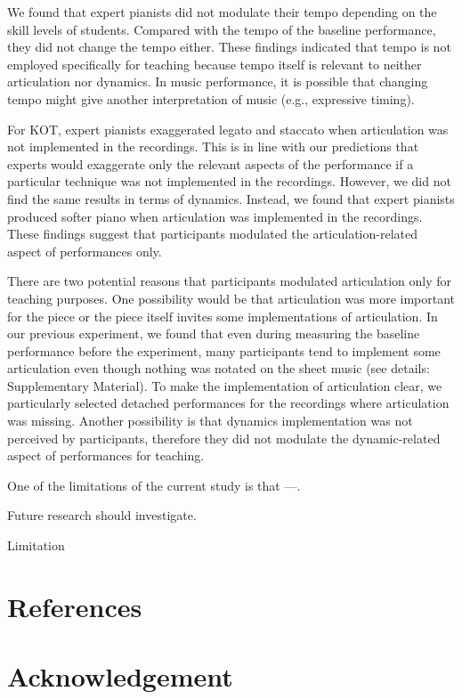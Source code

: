 \documentclass[
  man]{apa6}
\begin{document}
We found that expert pianists did not modulate their tempo depending on the skill levels of students. Compared with the tempo of the baseline performance, they did not change the tempo either. These findings indicated that tempo is not employed specifically for teaching because tempo itself is relevant to neither articulation nor dynamics. In music performance, it is possible that changing tempo might give another interpretation of music (e.g., expressive timing).

For KOT, expert pianists exaggerated legato and staccato when articulation was not implemented in the recordings. This is in line with our predictions that experts would exaggerate only the relevant aspects of the performance if a particular technique was not implemented in the recordings. However, we did not find the same results in terms of dynamics. Instead, we found that expert pianists produced softer piano when articulation was implemented in the recordings. These findings suggest that participants modulated the articulation-related aspect of performances only.

There are two potential reasons that participants modulated articulation only for teaching purposes. One possibility would be that articulation was more important for the piece or the piece itself invites some implementations of articulation. In our previous experiment, we found that even during measuring the baseline performance before the experiment, many participants tend to implement some articulation even though nothing was notated on the sheet music (see details: Supplementary Material). To make the implementation of articulation clear, we particularly selected detached performances for the recordings where articulation was missing. Another possibility is that dynamics implementation was not perceived by participants, therefore they did not modulate the dynamic-related aspect of performances for teaching.

One of the limitations of the current study is that ---.

Future research should investigate.

Limitation

\hypertarget{references}{%
\section{References}\label{references}}

\hypertarget{acknowledgement}{%
\section{Acknowledgement}\label{acknowledgement}}
\end{document}
